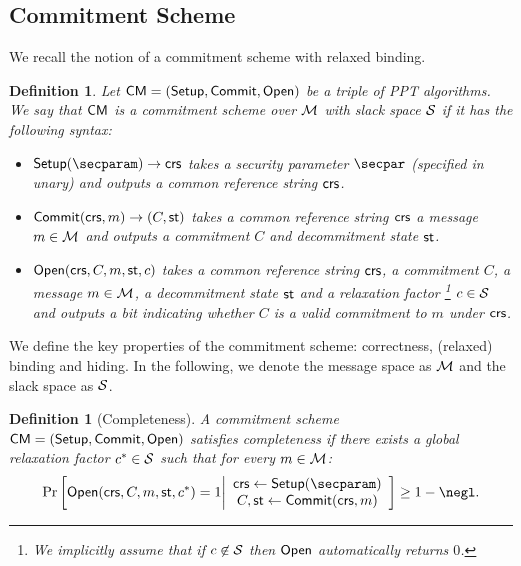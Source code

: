 \documentclass[11pt,letterpaper]{article}
\newcounter{theo}[section]
\newtheorem{definition}[theorem]{Definition}
\theoremstyle{definition} %
\newcommand{\from}{\gets}
\begin{document}
\subsection{Commitment Scheme}
We recall the notion of a commitment scheme with relaxed binding.
\begin{definition}
  Let $\mathsf{CM} = (\mathsf{Setup}, \mathsf{Commit}, \mathsf{Open})$ be a triple of PPT algorithms. We say that $\mathsf{CM}$ is a commitment scheme over $\mathcal{M}$ with slack space $\mathcal{S}$ if it has the following syntax:
  \begin{itemize}[nolistsep]
    \item $\setup(\secparam) \to \crs$ takes a security parameter $\secpar$ (specified in unary) and outputs a common reference string $\mathsf{crs}$.
    \item $\mathsf{Commit}(\mathsf{crs}, m) \to (C, \mathsf{st})$ takes a common reference string $\mathsf{crs}$ a message $m \in \mathcal{M}$ and outputs a commitment $C$ and decommitment state $\mathsf{st}$.
    \item $\mathsf{Open}(\mathsf{crs}, C, m, \mathsf{st}, c)$ takes a common reference string $\mathsf{crs}$, a commitment $C$, a message $m \in \mathcal{M}$, a decommitment state $\mathsf{st}$ and a relaxation factor \footnote{We implicitly assume that if $c \not\in \mathcal{S}$ then $\mathsf{Open}$ automatically returns $0$.} $c \in \mathcal{S}$ and outputs a bit indicating whether $C$ is a valid commitment to $m$ under $\mathsf{crs}$.
  \end{itemize}
\end{definition}
\noindent We define the key properties of the commitment scheme: correctness, (relaxed) binding and hiding. In the following, we denote the message space as $\mathcal{M}$ and the slack space as $\mathcal{S}$. 
\begin{definition}[Completeness] A commitment scheme $\mathsf{CM} = (\mathsf{Setup}, \mathsf{Commit}, \mathsf{Open})$ satisfies completeness if there exists a global relaxation factor $c^* \in \mathcal{S}$ such that for every $m \in \mathcal{M}$:
      \begin{equation*}
        \Pr\left[
          \open(\crs, C, m, \commitmentState, c^*) = 1
          \middle|
          \begin{array}{c}
            \crs \from \setup(\secparam) \\
            C, \commitmentState \from \commit(\crs, m) \\
          \end{array}
        \right] \geq 1 - \negl.
      \end{equation*}
\end{definition}
\end{document}
